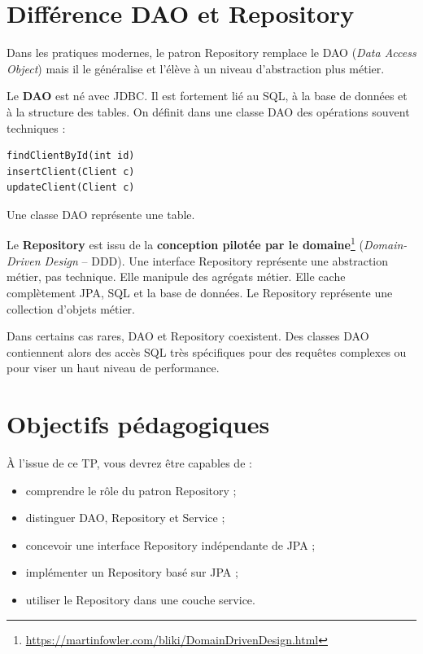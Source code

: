 \documentclass[11pt]{article}
\begin{document}
\bigskip

\section{Différence DAO et Repository}

Dans les pratiques modernes, le patron Repository remplace le DAO (\textit{Data Access Object}) mais il le généralise et l’élève à un niveau d’abstraction plus métier.

Le \textbf{DAO} est né avec JDBC. Il est fortement lié au SQL, à la base de données et à la structure des tables. On définit dans une classe DAO des opérations souvent techniques : 
\begin{verbatim}
findClientById(int id)
insertClient(Client c)
updateClient(Client c)
\end{verbatim}

Une classe DAO représente une table.

Le \textbf{Repository} est issu de la \textbf{conception pilotée par le domaine}\footnote{\url{https://martinfowler.com/bliki/DomainDrivenDesign.html}} (\textit{Domain-Driven Design} -- DDD). Une interface Repository représente une abstraction métier, pas technique. Elle manipule des agrégats métier. Elle cache complètement JPA, SQL et la base de données. Le Repository représente une collection d’objets métier.

Dans certains cas rares, DAO et Repository coexistent. Des classes DAO contiennent alors des accès SQL très spécifiques pour des requêtes complexes ou pour viser un haut niveau de performance.

\section*{Objectifs pédagogiques}

À l’issue de ce TP, vous devrez être capables de :
\begin{itemize}
    \item comprendre le rôle du patron Repository ;
    \item distinguer DAO, Repository et Service ;
    \item concevoir une interface Repository indépendante de JPA ;
    \item implémenter un Repository basé sur JPA ;
    \item utiliser le Repository dans une couche service.
\end{itemize}
\end{document}
